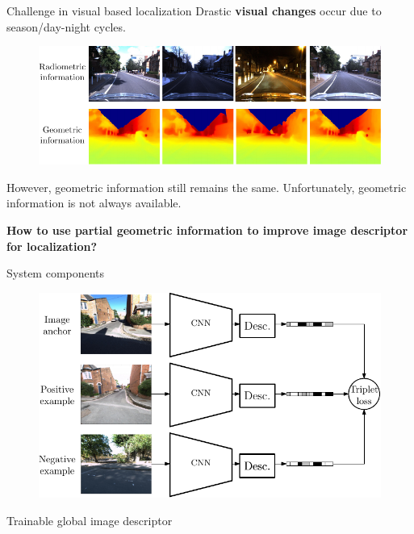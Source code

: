 \documentclass[final]{beamer}
\newlength{\colwidth}
\begin{document}
\begin{frame}[t]
\begin{columns}[t]
\begin{column}{\colwidth}
  \vspace{2cm}

  \begin{block}{Challenge in visual based localization}
     Drastic \textbf{visual changes} occur due to season/day-night cycles.

	\begin{figure}
		\includegraphics[width=\linewidth]{vect/intro/fig4/radvsdepth}
	\end{figure}

	However, {geometric information} still remains the same. Unfortunately, geometric information is not always available.

	\textbf{How to use partial geometric information to improve image descriptor for localization?}
  \end{block}
  
  \vspace{2cm}

  \begin{block}{System components}
    \begin{minipage}{0.75\linewidth}
        \centering
    	\begin{figure}
		  \includegraphics[width=\linewidth]{vect/method/fig2/3n}
		\end{figure}	
    \end{minipage}\hfill
    \begin{minipage}{0.23\linewidth}
      	{\footnotesize Trainable global image descriptor} 
    \end{minipage}
    

\end{block}
\end{column}
\end{columns}
\end{frame}
\end{document}
